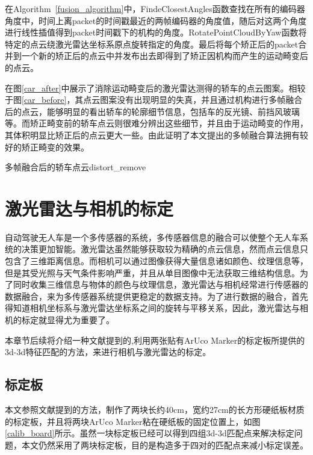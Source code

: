在Algorithm~\ref{fusion_algorithm}中，FindeClosestAngles函数查找在所有的编码器角度中，时间上离packet的时间戳最近的两帧编码器的角度值，随后对这两个角度进行线性插值得到packet时间戳下的机构的角度。RotatePointCloudByYaw函数将特定的点云绕激光雷达坐标系原点旋转指定的角度。最后将每个矫正后的packet合并到一个新的矫正后的点云中并发布出去即得到了矫正因机构而产生的运动畸变后的点云。

在图\ref{car_after}中展示了消除运动畸变后的激光雷达测得的轿车的点云图案。相较于图\ref{car_before}，其点云图案没有出现明显的失真，并且通过机构进行多帧融合后的点云，能够明显的看出轿车的轮廓细节信息，包括车的反光镜、前挡风玻璃等。而矫正畸变前的轿车点云则很难分辨出这些细节，并且由于运动畸变的作用，其体积明显比矫正后的点云更大一些。由此证明了本文提出的多帧融合算法拥有较好的矫正畸变的效果。

\begin{pics}[htbp]{多帧融合后的轿车点云}{distort_remove}
\end{pics}

\section{激光雷达与相机的标定}

自动驾驶无人车是一个多传感器的系统，多传感器信息的融合可以使整个无人车系统的决策更加智能。激光雷达虽然能够获取较为精确的点云信息，然而点云信息只包含了三维距离信息。而相机可以通过图像获得大量信息诸如颜色、纹理信息等，但是其受光照与天气条件影响严重，并且从单目图像中无法获取三维结构信息。为了同时收集三维信息与物体的颜色与纹理信息，激光雷达与相机经常进行传感器的数据融合，来为多传感器系统提供更稳定的数据支持。为了进行数据的融合，首先得知道相机坐标系与激光雷达坐标系之间的旋转与平移关系，因此，激光雷达与相机的标定就显得尤为重要了。

本章节后续将介绍一种文献提到的,利用两张贴有ArUco Marker的标定板所提供的3d-3d特征匹配的方法，来进行相机与激光雷达的标定。

\subsection{标定板}
本文参照文献提到的方法，制作了两块长约40cm，宽约27cm的长方形硬纸板材质的标定板，并且将两块ArUco Marker粘在硬纸板的固定位置上，如图\ref{calib_board}所示。虽然一块标定板已经可以得到四组3d-3d匹配点来解决标定问题，本文仍然采用了两块标定板，目的是构造多于四对的匹配点来减小标定误差。

